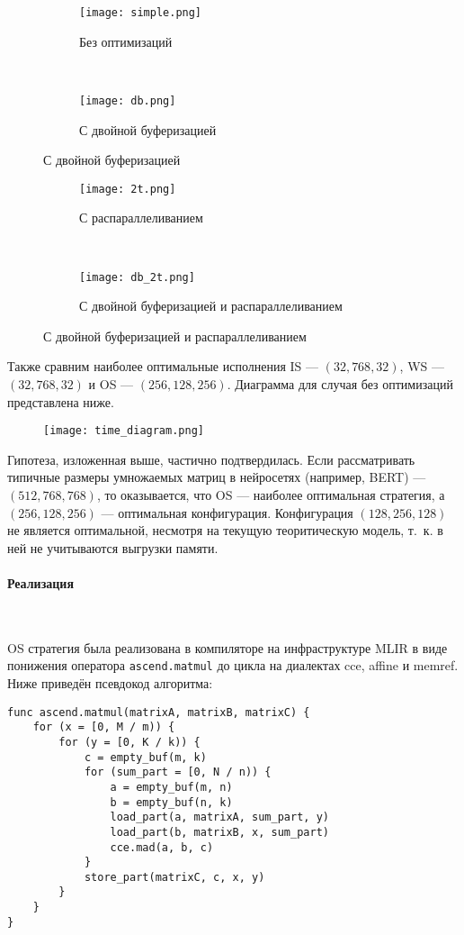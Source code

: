\begin{figure}[h!]
    \centering
    \begin{subfigure}{0.45 \textwidth}
        \texttt{[image: simple.png]}
        \caption{Без оптимизаций}
    \end{subfigure}
    ~
    \begin{subfigure}{0.45 \textwidth}
        \texttt{[image: db.png]}
        \caption{С двойной буферизацией}
    \end{subfigure}
\end{figure}
\begin{figure}[h!]
    \begin{subfigure}{0.45 \textwidth}
        \texttt{[image: 2t.png]}
        \caption{С распараллеливанием}
    \end{subfigure}
    ~
    \begin{subfigure}{0.45 \textwidth}
        \texttt{[image: db\_2t.png]}
        \caption{С двойной буферизацией и распараллеливанием}
    \end{subfigure}
\end{figure}

Также сравним наиболее оптимальные исполнения IS --- $(32, 768, 32)$,
WS --- $(32, 768, 32)$ и OS --- $(256, 128, 256)$. Диаграмма
для случая без оптимизаций представлена ниже.

\begin{figure}[h!]
    \centering
    \texttt{[image: time\_diagram.png]}
\end{figure}

Гипотеза, изложенная выше, частично подтвердилась.
Если рассматривать типичные размеры умножаемых матриц в нейросетях (например,
BERT) --- $(512, 768, 768)$, то оказывается, что OS --- наиболее оптимальная
стратегия, а $(256, 128, 256)$ --- оптимальная конфигурация. Конфигурация
$(128, 256, 128)$ не является оптимальной, несмотря на текущую теоритическую
модель, т.~к. в ней не учитываются выгрузки памяти.

\paragraph{Реализация}~

OS стратегия была реализована в компиляторе на инфраструктуре MLIR в виде
понижения оператора \texttt{ascend.matmul} до цикла на диалектах cce,
affine и memref. Ниже приведён псевдокод алгоритма:

\begin{lstlisting}
func ascend.matmul(matrixA, matrixB, matrixC) {
    for (x = [0, M / m)) {
        for (y = [0, K / k)) {
            c = empty_buf(m, k)
            for (sum_part = [0, N / n)) {
                a = empty_buf(m, n)
                b = empty_buf(n, k)
                load_part(a, matrixA, sum_part, y)
                load_part(b, matrixB, x, sum_part)
                cce.mad(a, b, c)
            }
            store_part(matrixC, c, x, y)
        }
    }
}
\end{lstlisting}

